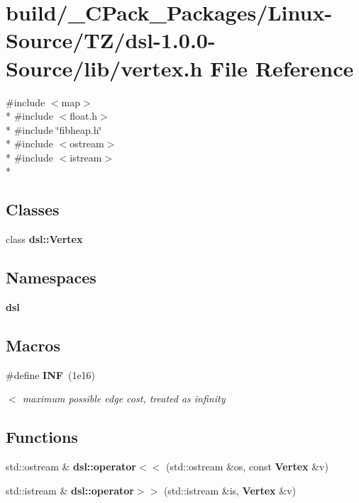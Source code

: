 \section{build/\-\_\-\-C\-Pack\-\_\-\-Packages/\-Linux-\/\-Source/\-T\-Z/dsl-\/1.0.0-\/\-Source/lib/vertex.h File Reference}
\label{build_2__CPack__Packages_2Linux-Source_2TZ_2dsl-1_80_80-Source_2lib_2vertex_8h}
{\ttfamily \#include $<$map$>$}\\*
{\ttfamily \#include $<$float.\-h$>$}\\*
{\ttfamily \#include \char`\"{}fibheap.\-h\char`\"{}}\\*
{\ttfamily \#include $<$ostream$>$}\\*
{\ttfamily \#include $<$istream$>$}\\*
\subsection*{Classes}
\begin{DoxyCompactItemize}
\item 
class {\bf dsl\-::\-Vertex}
\end{DoxyCompactItemize}
\subsection*{Namespaces}
\begin{DoxyCompactItemize}
\item 
{\bf dsl}
\end{DoxyCompactItemize}
\subsection*{Macros}
\begin{DoxyCompactItemize}
\item 
\#define {\bf I\-N\-F}~(1e16)
\begin{DoxyCompactList}\small\item\em $<$ maximum possible edge cost, treated as infinity \end{DoxyCompactList}\end{DoxyCompactItemize}
\subsection*{Functions}
\begin{DoxyCompactItemize}
\item 
std\-::ostream \& {\bf dsl\-::operator$<$$<$} (std\-::ostream \&os, const {\bf Vertex} \&v)
\item 
std\-::istream \& {\bf dsl\-::operator$>$$>$} (std\-::istream \&is, {\bf Vertex} \&v)
\end{DoxyCompactItemize}


